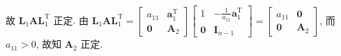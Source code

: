 \begin{tcolorbox}[enhanced,colback=10,colframe=9,breakable,coltitle=green!25!black,title=2024]
故 $ \boldsymbol{L}_{1} \boldsymbol{A} \boldsymbol{L}_{1}^{\mathrm{T}} $ 正定.
由 $ \boldsymbol{L}_{1} \boldsymbol{A} \boldsymbol{L}_{1}^{\mathrm{T}}=\left[\begin{array}{cc}a_{11} & \boldsymbol{a}_{1}^{\mathrm{T}} \\ \mathbf{0} & \boldsymbol{A}_{2}\end{array}\right]\left[\begin{array}{cc}1 & -\frac{1}{a_{11}} \boldsymbol{a}_{1}^{\mathrm{T}} \\ \mathbf{0} & \boldsymbol{I}_{n-1}\end{array}\right]=\left[\begin{array}{cc}a_{11} & \mathbf{0} \\ \mathbf{0} & \boldsymbol{A}_{2}\end{array}\right] $, 而 $ a_{11}>0 $, 故知 $ \boldsymbol{A}_{2} $ 正定.
\end{tcolorbox}

